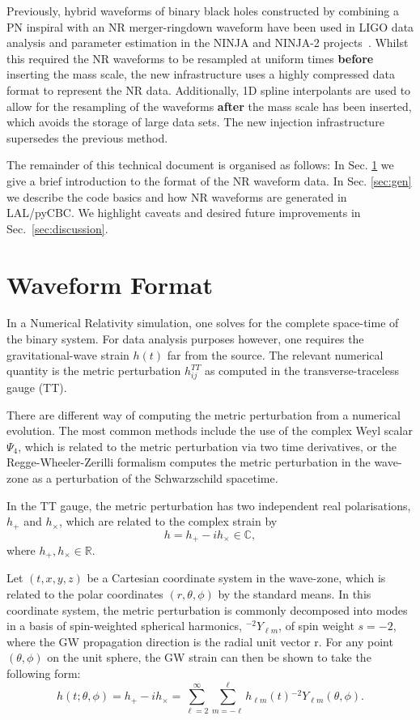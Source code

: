 \documentclass[aps,prd,amssymb,amsmath,amsfonts,superscriptaddress,
floatfix ,preprintnumbers,altaffilletter]{revtex4}
\begin{document}
Previously, hybrid waveforms of binary black holes constructed by combining a PN inspiral with an NR merger-ringdown 
waveform have been
used in LIGO data analysis and parameter estimation in the NINJA and NINJA-2 projects~\cite{Aylott:2009ya, Aasi:2014tra}. Whilst this required the
NR waveforms to be resampled at uniform times \textbf{before} inserting the mass scale, the new infrastructure uses a highly
compressed data format to represent the NR data. Additionally, 1D spline interpolants are used to allow for the resampling
of the waveforms \textbf{after} the mass scale has been inserted, which avoids the storage of large data sets.
The new injection infrastructure supersedes the previous method.

The remainder of this technical document is organised as follows: In Sec. \ref{sec:format} we give a brief introduction
to the format of the NR waveform data. In Sec. \ref{sec:gen} we describe the code basics and how NR waveforms
are generated in LAL/pyCBC. We highlight caveats and desired future improvements in Sec.~\ref{sec:discussion}.

\section{Waveform Format}
\label{sec:format}
In a Numerical Relativity simulation, one solves for the complete space-time of the binary system. For data analysis
purposes however, one requires the gravitational-wave strain $h(t)$ far from the source. The relevant numerical quantity
is the metric perturbation $h^{TT}_{ij}$ as computed in the transverse-traceless gauge (TT). 

There are different way of computing the metric perturbation from a numerical evolution. The most common methods include
the use of the complex Weyl scalar $\Psi_4$, which is related to the metric perturbation via two time derivatives, or the
Regge-Wheeler-Zerilli formalism computes the metric perturbation in the wave-zone as a perturbation of the Schwarzschild
spacetime. 

In the TT gauge, the metric perturbation
has two independent real polarisations, $h_+$ and $h_\times$, which are related to the complex strain by
\begin{equation}
\label{ }
h = h_+ - i h_\times \in \mathbb{C},
\end{equation}
where $h_+, h_\times \in \mathbb{R}$.

Let $(t,x,y,z)$ be a Cartesian coordinate system in the wave-zone, which is related to the polar coordinates $(r, \theta, \phi)$ by the standard means. 
In this coordinate system, the metric perturbation is commonly decomposed into modes
in a basis of spin-weighted spherical harmonics, ${}^{-2}Y_{\ell m}$, of spin weight $s=-2$, where the GW propagation direction is
the radial unit vector r.
For any point $(\theta, \phi)$ on the unit sphere, the GW strain can then be shown to take the following form:
\begin{equation}
\label{ }
h(t; \theta, \phi) = h_+ - i h_\times = \sum_{\ell=2}^\infty \sum_{m=-\ell}^{\ell} h_{\ell m}(t) {}^{-2}Y_{\ell m}(\theta,\phi).
\end{equation}
\end{document}
